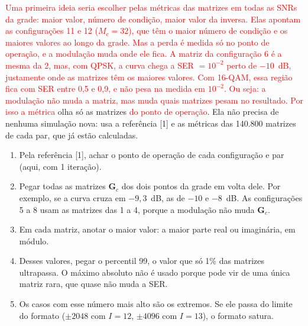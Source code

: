 \documentclass[11pt]{article}
\newcommand{\novo}[1]{\textcolor{red}{#1}}
\begin{document}
\novo{Uma primeira ideia seria escolher pelas métricas das matrizes em todas as SNRs da grade:
maior valor, número de condição, maior valor da inversa. Elas apontam as configurações 11 e 12
($M_c = 32$), que têm o maior número de condição e os maiores valores ao longo da grade. Mas a
perda é medida só no ponto de operação, e a modulação muda onde ele fica. A matriz da
configuração 6 é a mesma da 2, mas, com QPSK, a curva chega a SER $= 10^{-2}$ perto de
$-10$~dB, justamente onde as matrizes têm os maiores valores. Com 16-QAM, essa região fica com
SER entre 0,5 e 0,9, e não pesa na medida em $10^{-2}$. Ou seja: a modulação não muda a matriz,
mas muda quais matrizes pesam no resultado. Por isso a métrica} olha só as matrizes \novo{do
ponto de operação}. Ela não precisa de nenhuma simulação
nova: usa a referência [1] e as métricas das 140.800 matrizes de cada par, que já estão
calculadas.
\begin{enumerate}
  \item Pela referência [1], achar o ponto de operação de cada configuração e par (aqui, com 1
        iteração).
  \item Pegar todas as matrizes $\mathbf G_c$ dos dois pontos da grade em volta dele. Por
        exemplo, se a curva cruza em $-9{,}3$~dB, as de $-10$ e $-8$~dB. As configurações 5 a 8
        usam as matrizes das 1 a 4, porque a modulação não muda $\mathbf G_c$.
  \item Em cada matriz, anotar o maior valor: a maior parte real ou imaginária, em módulo.
  \item Desses valores, pegar o percentil 99, o valor que só 1\% das matrizes ultrapassa. O
        máximo absoluto não é usado porque pode vir de uma única matriz rara, que quase não muda a
        SER.
  \item Os casos com esse número mais alto são os extremos. Se ele passa do limite do formato
        ($\pm 2048$ com $I = 12$, $\pm 4096$ com $I = 13$), o formato satura.
\end{enumerate}
\end{document}
